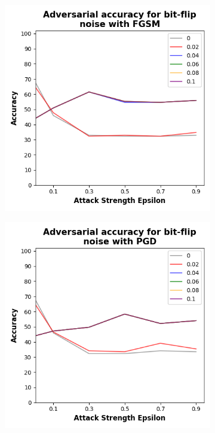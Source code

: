 \begin{figure}[!h]
  \centering

  \begin{subfigure}{0.45\textwidth}
      \includegraphics[width=\linewidth]{figures/evaluation_results/diabetes/pqc/figures/bit-flip-fgsm.png}
      \label{fig:diabetes7}
  \end{subfigure} \qquad
  \begin{subfigure}{0.45\textwidth}
      \includegraphics[width=\linewidth]{figures/evaluation_results/diabetes/pqc/figures/bit-flip-pgd.png}

\end{subfigure}
\end{figure}
